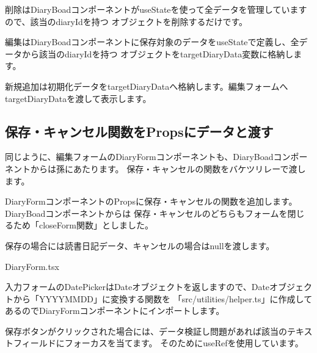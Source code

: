 削除はDiaryBoadコンポーネントがuseStateを使って全データを管理していますので、該当のdiaryIdを持つ
オブジェクトを削除するだけです。

\vspace*{\baselineskip}

編集はDiaryBoadコンポーネントに保存対象のデータをuseStateで定義し、全データから該当のdiaryIdを持つ
オブジェクトをtargetDiaryData変数に格納します。

\vspace*{\baselineskip}

新規追加は初期化データをtargetDiaryDataへ格納します。編集フォームへtargetDiaryDataを渡して表示します。

\subsection{保存・キャンセル関数をPropsにデータと渡す}
\keeplastskip{
  \label{sec:3-4-2}
  \label{sec-034-1}
  \par\nobreak
}

同じように、編集フォームのDiaryFormコンポーネントも、DiaryBoadコンポーネントからは孫にあたります。
保存・キャンセルの関数をバケツリレーで渡します。

DiaryFormコンポーネントのPropsに保存・キャンセルの関数を追加します。DiaryBoadコンポーネントからは
保存・キャンセルのどちらもフォームを閉じるため「closeForm関数」としました。

\vspace*{\baselineskip}

保存の場合には読書日記データ、キャンセルの場合はnullを渡します。

\def\startercodeblockfontsize{}
\begin{starterprogram}[]{DiaryForm.tsx}\end{starterprogram}

入力フォームのDatePickerはDateオブジェクトを返しますので、Dateオブジェクトから「YYYYMMDD」に変換する関数を
「src/utilities/helper.ts」に作成してあるのでDiaryFormコンポーネントにインポートします。

\vspace*{\baselineskip}

保存ボタンがクリックされた場合には、データ検証し問題があれば該当のテキストフィールドにフォーカスを当てます。
そのためにuseRefを使用しています。

\vspace*{\baselineskip}

